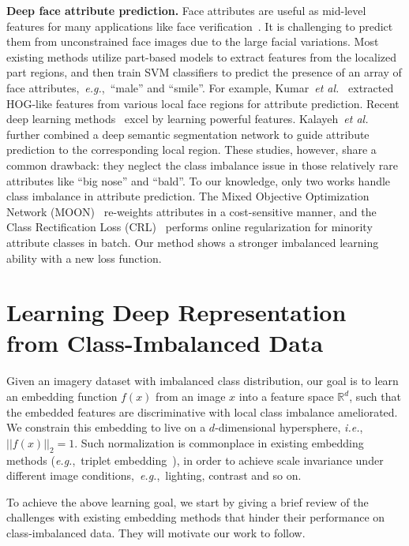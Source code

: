 \documentclass[10pt,journal,compsoc]{IEEEtran}
\newcommand{\etal}{\emph{et al.}}
\newcommand{\eg}{\emph{e.g.}}
\newcommand{\ie}{\emph{i.e.}}
\begin{document}
\noindent
{\bf Deep face attribute prediction.} Face attributes are useful as mid-level features for many applications like face verification~\cite{berg13,kumar2011describable}. It is challenging to predict them from unconstrained face images due to the large facial variations. Most existing methods utilize part-based models to extract features from the localized part regions, and then train SVM classifiers to predict the presence of an array of face attributes,~\eg,~``male'' and ``smile''. For example, Kumar~\etal~\cite{kumar2011describable} extracted HOG-like features from various local face regions for attribute prediction. Recent deep learning methods~\cite{liu15,Ning14,Kalayeh17} excel by learning powerful features. Kalayeh~\etal~\cite{Kalayeh17} further combined a deep semantic segmentation network to guide attribute prediction to the corresponding local region. These studies, however, share a common drawback: they neglect the class imbalance issue in those relatively rare attributes like ``big nose'' and ``bald''. To our knowledge, only two works handle class imbalance in attribute prediction. The Mixed Objective Optimization Network (MOON)~\cite{Rudd2016} re-weights attributes in a cost-sensitive manner, and the Class Rectification Loss (CRL)~\cite{Dong_2017_ICCV} performs online regularization for minority attribute classes in batch. Our method shows a stronger imbalanced learning ability with a new loss function.

\section{Learning Deep Representation from Class-Imbalanced Data}
\label{sec:method}

Given an imagery dataset with imbalanced class distribution, our goal is to learn an embedding function $f(x)$ from an image $x$ into a feature space $\mathbb{R}^d$, such that the embedded features are discriminative with local class imbalance ameliorated. We constrain this embedding to live on a $d$-dimensional hypersphere, \ie,~$||f(x)||_2 = 1$. Such normalization is commonplace in existing embedding methods (\eg,~triplet embedding~\cite{Schroff15}), in order to achieve scale invariance under different image conditions,~\eg,~lighting, contrast and so on.

To achieve the above learning goal, we start by giving a brief review of the challenges with existing embedding methods that hinder their performance on class-imbalanced data. They will motivate our work to follow.
\end{document}

